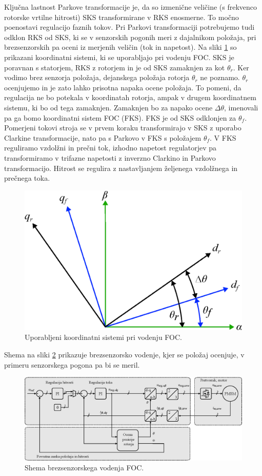 \documentclass[a4paper,twoside,openright,12pt,slovene]{book}
\begin{document}
Ključna lastnost Parkove transformacije je, da so izmenične veličine (s frekvenco rotorske vrtilne hitrosti) SKS transformirane v RKS enosmerne. To močno poenostavi regulacijo faznih
tokov. Pri Parkovi transformaciji potrebujemo tudi odklon RKS od SKS, ki se v senzorskih pogonih meri z dajalnikom položaja, pri brezsenzorskih pa oceni iz merjenih veličin (tok in napetost). Na sliki
\ref{koordinatniSistemSimple} so prikazani koordinatni sistemi, ki se uporabljajo pri vodenju FOC. SKS je poravnan s statorjem, RKS z rotorjem in je od SKS zamaknjen za kot $\theta_r$. Ker vodimo brez 
senzorja položaja, dejanskega položaja rotorja $\theta_r$ ne poznamo. $\theta_r$ ocenjujemo in je zato lahko prisotna napaka ocene položaja. To pomeni, da regulacija ne bo potekala v koordinatah rotorja,
ampak v drugem koordinatnem sistemu, ki bo od tega zamaknjen. Zamaknjen bo za napako ocene $\Delta\theta$, imenovali pa ga bomo koordinatni sistem FOC (FKS). FKS je od SKS odklonjen za $\theta_f$. \\
Pomerjeni tokovi stroja se v prvem koraku transformirajo v SKS z uporabo Clarkine transformacije, nato pa s Parkovo v FKS s položajem $\theta_f$. V FKS reguliramo vzdolžni in prečni tok, izhodno
napetost regulatorjev pa transformiramo v trifazne napetosti z inverzno Clarkino in Parkovo transformacijo. Hitrost se regulira z nastavljanjem željenega vzdolžnega in prečnega toka.

\begin{figure}[!htbp]
    \centering
    \includegraphics[width=0.7\columnwidth]{Slike/Inkscape/koordinatniSistemSimple.eps}
    \caption{\label{koordinatniSistemSimple} Uporabljeni koordinatni sistemi pri vodenju FOC.}
\end{figure}

Shema na sliki \ref{FOCshema} prikazuje brezsenzorsko vodenje, kjer se položaj ocenjuje, v primeru senzorskega pogona pa bi se meril.

\begin{figure}[!htbp]
    \centering
    \includegraphics[width=1\columnwidth]{Slike/Inkscape/FOCsimple.eps}
    \caption{\label{FOCshema} Shema brezsenzorskega vodenja FOC. }
\end{figure}
\end{document}
